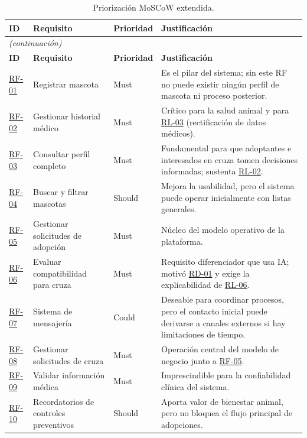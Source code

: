 \documentclass[journal,onecolumn]{IEEEtran}
\begin{document}
	\begin{longtable}{@{}p{1.6cm} p{4.8cm} p{1.6cm} p{5.2cm}@{}}
		\caption{Priorización MoSCoW extendida.}
		\label{tab:priorizacion_moscow_parcial} \\
		\hline
		\textbf{ID} & \textbf{Requisito} & \textbf{Prioridad} & \textbf{Justificación} \\
		\hline
		\endfirsthead
		\multicolumn{4}{|l|}{\textit{(continuación)}} \\
		\hline
		\textbf{ID} & \textbf{Requisito} & \textbf{Prioridad} & \textbf{Justificación} \\
		\hline
		\endhead
		\hline
		\endfoot
		\hyperref[tab:RF-01]{RF-01} & Registrar mascota & Must & Es el pilar del sistema; sin este RF no puede existir ningún perfil de mascota ni proceso posterior. \\
		\hline
		\hyperref[tab:RF-02]{RF-02} & Gestionar historial médico & Must & Crítico para la salud animal y para \hyperref[rl:03]{RL-03} (rectificación de datos médicos). \\
		\hline
		\hyperref[tab:RF-03]{RF-03} & Consultar perfil completo & Must & Fundamental para que adoptantes e interesados en cruza tomen decisiones informadas; sustenta \hyperref[rl:02]{RL-02}. \\
		\hline
		\hyperref[tab:RF-04]{RF-04} & Buscar y filtrar mascotas & Should & Mejora la usabilidad, pero el sistema puede operar inicialmente con listas generales. \\
		\hline
		\hyperref[tab:RF-05]{RF-05} & Gestionar solicitudes de adopción & Must & Núcleo del modelo operativo de la plataforma. \\
		\hline
		\hyperref[tab:RF-06]{RF-06} & Evaluar compatibilidad para cruza & Must & Requisito diferenciador que usa IA; motivó \hyperref[tab:RD-01]{RD-01} y exige la explicabilidad de \hyperref[rl:06]{RL-06}. \\
		\hline
		\hyperref[tab:RF-07]{RF-07} & Sistema de mensajería & Could & Deseable para coordinar procesos, pero el contacto inicial puede derivarse a canales externos si hay limitaciones de tiempo. \\
		\hline
		\hyperref[tab:RF-08]{RF-08} & Gestionar solicitudes de cruza & Must & Operación central del modelo de negocio junto a \hyperref[tab:RF-05]{RF-05}. \\
		\hline
		\hyperref[tab:RF-09]{RF-09} & Validar información médica & Must & Imprescindible para la confiabilidad clínica del sistema. \\
		\hline
		\hyperref[tab:RF-10]{RF-10} & Recordatorios de controles preventivos & Should & Aporta valor de bienestar animal, pero no bloquea el flujo principal de adopciones. \\

\end{longtable}
\end{document}

